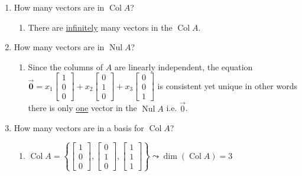 \documentclass[letter,11pt]{article}
\theoremstyle{definition}
\begin{document}
\begin{enumerate}[label = \roman*.]
    \item How many vectors are in $\operatorname{Col} A$?
    \begin{enumerate}
        \item There are \underline{infinitely} many vectors in the $\operatorname{Col} A$. 
    \end{enumerate}
    \item How many vectors are in $\operatorname{Nul} A$?
    \begin{enumerate}
        \item Since the columns of $A$ are linearly independent, the equation $\displaystyle \vec{\boldsymbol{0}} = x_{1}\begin{bmatrix}1 \\ 0 \\ 0 \end{bmatrix}+x_{2}\begin{bmatrix}0 \\ 1 \\ 0 \end{bmatrix}+x_{3}\begin{bmatrix}0 \\ 0 \\ 1 \end{bmatrix}$ is consistent yet unique in other words there is only \underline{one} vector in the $\operatorname{Nul} A$ i.e. $\vec{0}$.
    \end{enumerate}
    \item How many vectors are in a basis for $\operatorname{Col} A$?
        \begin{enumerate}
            \item $\displaystyle \operatorname{Col} A = \left\{\begin{bmatrix}1 \\ 0 \\ 0 \end{bmatrix}, \begin{bmatrix}0 \\ 1 \\ 0 \end{bmatrix}, \begin{bmatrix}1 \\ 1 \\ 1 \end{bmatrix}\right\} \leadsto \operatorname{dim}\left( \operatorname{Col} A\right) =3$
        \end{enumerate}
\end{enumerate}
\end{document}
